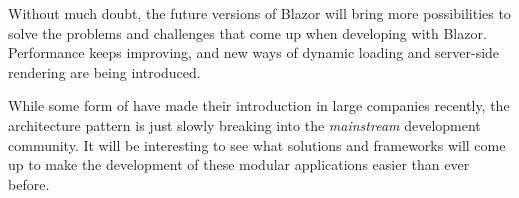 Without much doubt, the future versions of Blazor will bring more possibilities
to solve the problems and challenges that come up when developing
 with Blazor. Performance keeps improving, and new ways
of dynamic loading and server-side rendering are being introduced. 

While some form of  have made their introduction in
large companies recently, the architecture pattern is just slowly breaking into
the \textit{mainstream} development community. It will be interesting to see
what solutions and frameworks will come up to make the development of these
modular applications easier than ever before.
